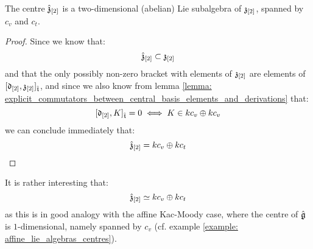        \begin{proposition} \label{prop: centres_of_extended_toroidal_lie_algebras}
            The centre $\hat{\mathfrak{z}}_{[2]}$ is a two-dimensional (abelian) Lie subalgebra of $\mathfrak{z}_{[2]}$, spanned by $c_v$ and $c_t$. 
        \end{proposition}
            \begin{proof}
                Since we know that:
                    $$\hat{\mathfrak{z}}_{[2]} \subset \mathfrak{z}_{[2]}$$
                and that the only possibly non-zero bracket with elements of $\mathfrak{z}_{[2]}$ are elements of $[\mathfrak{d}_{[2]}, \mathfrak{z}_{[2]}]_{\hat{\mathfrak{t}}}$, and since we also know from lemma \ref{lemma: explicit_commutators_between_central_basis_elements_and_derivations} that:
                    $$[\mathfrak{d}_{[2]}, K]_{\hat{\mathfrak{t}}} = 0 \iff K \in k c_v \oplus k c_v$$
                we can conclude immediately that:
                    $$\hat{\mathfrak{z}}_{[2]} = k c_v \oplus k c_t$$
            \end{proof}
        \begin{remark}
            It is rather interesting that:
                $$\hat{\mathfrak{z}}_{[2]} \simeq k c_v \oplus k c_t$$
            as this is in good analogy with the affine Kac-Moody case, where the centre of $\hat{\mathfrak{g}}$ is $1$-dimensional, namely spanned by $c_v$ (cf. example \ref{example: affine_lie_algebras_centres}).
        \end{remark}